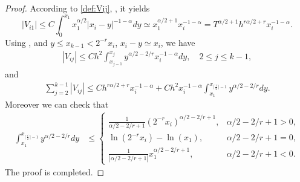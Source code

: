 \documentclass{amsart}
\theoremstyle{definition}
\theoremstyle{remark}
\numberwithin{equation}{section}
\begin{document}
\begin{proof}
  According to \eqref{def:Vij}, , it yields
  \begin{equation*}
    |V_{i1}| \le C \int_{0}^{x_1} x_1^{\alpha/2} |x_i-y|^{-1-\alpha}dy \simeq x_1^{\alpha/2+1} x_i^{-1-\alpha} = T^{\alpha/2+1} h^{r\alpha/2+r} x_i^{-1-\alpha}.
  \end{equation*}
  Using ,  and $y\le x_{k-1} < 2^{-r}x_i $, \(x_i - y \simeq x_i\), we have
  \begin{equation*}
    \begin{aligned}
      |V_{ij}| 
             \le C h^2 \int_{x_{j-1}}^{x_{j}} y^{\alpha/2-2/r} x_i^{-1-\alpha} dy, \quad 2 \le j \le k-1,
    \end{aligned}
  \end{equation*}
  and
  \begin{equation*}
    \begin{aligned}
      \sum_{j=2}^{k-1} |V_{ij}|
        \le C h^{r\alpha/2+r} x_i^{-1-\alpha} + C h^2 x_i^{-1-\alpha} \int_{x_1}^{x_{\lceil\frac{i}{2}\rceil-1}} y^{\alpha/2-2/r} dy.
    \end{aligned}
  \end{equation*}
  Moreover we can check that
  \begin{equation*}
    \begin{aligned}
      \int_{x_1}^{x_{\lceil\frac{i}{2}\rceil-1}} y^{\alpha/2-2/r} dy
       & \le \begin{cases}
               \frac{1}{\alpha/2-2/r+1} (2^{-r} x_i)^{\alpha/2-2/r+1}  ,& \alpha/2-2/r+1 > 0, \\
               \ln(2^{-r} x_i) - \ln(x_1)                              ,& \alpha/2-2/r+1 = 0, \\
               \frac{1}{|\alpha/2-2/r+1|} x_1^{\alpha/2-2/r+1}         ,& \alpha/2-2/r+1 < 0.
             \end{cases}
    \end{aligned}
  \end{equation*}
  The proof is completed.
\end{proof}
\end{document}
